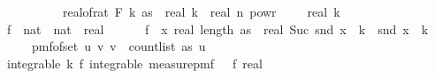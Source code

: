 \begin{isabellebody}
\ \ \ \ \ \ \ \ \ {\isasymle}\ {\isacharparenleft}{\kern0pt}real{\isacharunderscore}{\kern0pt}of{\isacharunderscore}{\kern0pt}rat\ {\isacharparenleft}{\kern0pt}F\ k\ as{\isacharparenright}{\kern0pt}{\isacharparenright}{\kern0pt}\ {\isacharasterisk}{\kern0pt}\ real\ k\ {\isacharasterisk}{\kern0pt}\ real\ n\ powr\ {\isacharparenleft}{\kern0pt}{}\ {\isacharminus}{\kern0pt}\ {}\ {\isacharslash}{\kern0pt}\ real\ k{\isacharparenright}{\kern0pt}{\isachardoublequoteclose}\isanewline
%
\isadelimproof
%
\endisadelimproof
%
\isatagproof
{}\isamarkupfalse%
\ {\isacharminus}{\kern0pt}\isanewline
\ \ \isamarkupfalse%
\ f\ {\isacharcolon}{\kern0pt}{\isacharcolon}{\kern0pt}\ {\isachardoublequoteopen}nat\ {\isasymtimes}\ nat\ {\isasymRightarrow}\ real{\isachardoublequoteclose}\ \isanewline
\ \ \ \ \ {\isachardoublequoteopen}f\ {\isacharequal}{\kern0pt}\ {\isacharparenleft}{\kern0pt}{\isasymlambda}x{\isachardot}{\kern0pt}\ {\isacharparenleft}{\kern0pt}real\ {\isacharparenleft}{\kern0pt}length\ as{\isacharparenright}{\kern0pt}\ {\isacharasterisk}{\kern0pt}\ real\ {\isacharparenleft}{\kern0pt}Suc\ {\isacharparenleft}{\kern0pt}snd\ x{\isacharparenright}{\kern0pt}\ {\isacharcircum}{\kern0pt}\ k\ {\isacharminus}{\kern0pt}\ snd\ x\ {\isacharcircum}{\kern0pt}\ k{\isacharparenright}{\kern0pt}{\isacharparenright}{\kern0pt}{\isacharparenright}{\kern0pt}{\isachardoublequoteclose}\isanewline
\ \ \isamarkupfalse%
\ {\isasymOmega}\ \ {\isachardoublequoteopen}{\isasymOmega}\ {\isacharequal}{\kern0pt}\ pmf{\isacharunderscore}{\kern0pt}of{\isacharunderscore}{\kern0pt}set\ {\isacharbraceleft}{\kern0pt}{\isacharparenleft}{\kern0pt}u{\isacharcomma}{\kern0pt}\ v{\isacharparenright}{\kern0pt}{\isachardot}{\kern0pt}\ v\ {\isacharless}{\kern0pt}\ count{\isacharunderscore}{\kern0pt}list\ as\ u{\isacharbraceright}{\kern0pt}{\isachardoublequoteclose}\isanewline
\ \ \isanewline
\ \ \isamarkupfalse%
\ integrable{\isacharcolon}{\kern0pt}\ {\isachardoublequoteopen}{\isasymAnd}k\ f{\isachardot}{\kern0pt}\ integrable\ {\isacharparenleft}{\kern0pt}measure{\isacharunderscore}{\kern0pt}pmf\ {\isasymOmega}{\isacharparenright}{\kern0pt}\ {\isacharparenleft}{\kern0pt}{\isasymlambda}{\isasymomega}{\isachardot}{\kern0pt}\ {\isacharparenleft}{\kern0pt}f\ {\isasymomega}{\isacharparenright}{\kern0pt}{\isacharcolon}{\kern0pt}{\isacharcolon}{\kern0pt}real{\isacharparenright}{\kern0pt}{\isachardoublequoteclose}\isanewline
\ \ \ \ \isamarkupfalse%

\end{isabellebody}

